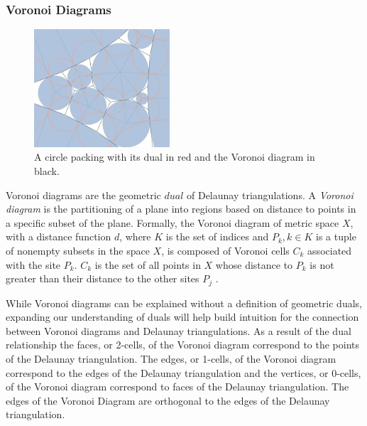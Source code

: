 \documentclass[11pt]{article}
\begin{document}
\subsubsection{Voronoi Diagrams}

\begin{figure}
  \begin{center}
    \includegraphics[scale=.18,width=0.45\textwidth]{voronoi}
  \end{center}
  \caption{A circle packing with its dual in red and the Voronoi diagram in black.}
\end{figure}

Voronoi diagrams are the geometric $dual$ of Delaunay triangulations. A \emph{Voronoi diagram} is the partitioning of a plane into regions based on distance to points in a specific subset of the plane. Formally, the Voronoi diagram of metric space $X$, with a distance function $d$, where $K$ is the set of indices and $P_k, k \in K$ is a tuple of nonempty subsets in the space $X$, is composed of Voronoi cells $C_k$ associated with the site $P_k$. $C_k$ is the set of all points in $X$ whose distance to $P_k$ is not greater than their distance to the other sites $P_j$ \cite{voronoiDiagrams}. 

While Voronoi diagrams can be explained without a definition of geometric duals, expanding our understanding of duals will help build intuition for the connection between Voronoi diagrams and Delaunay triangulations. As a result of the dual relationship the faces, or 2-cells, of the Voronoi diagram correspond to the points of the Delaunay triangulation. The edges, or 1-cells, of the Voronoi diagram correspond to the edges of the Delaunay triangulation and the vertices, or 0-cells, of the Voronoi diagram correspond to faces of the Delaunay triangulation. The edges of the Voronoi Diagram are orthogonal to the edges of the Delaunay triangulation. 
\end{document}
